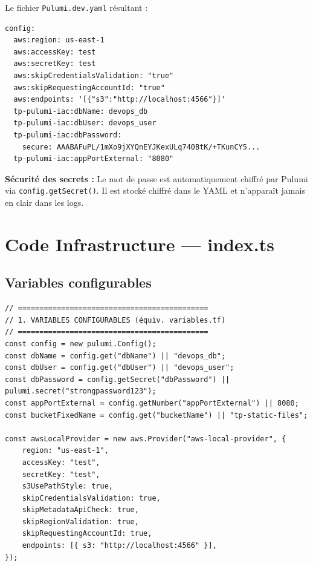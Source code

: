 \documentclass[12pt,a4paper]{article}
\begin{document}
Le fichier \texttt{Pulumi.dev.yaml} résultant :

\begin{lstlisting}[style=hclStyle, caption=Pulumi.dev.yaml]
config:
  aws:region: us-east-1
  aws:accessKey: test
  aws:secretKey: test
  aws:skipCredentialsValidation: "true"
  aws:skipRequestingAccountId: "true"
  aws:endpoints: '[{"s3":"http://localhost:4566"}]'
  tp-pulumi-iac:dbName: devops_db
  tp-pulumi-iac:dbUser: devops_user
  tp-pulumi-iac:dbPassword:
    secure: AAABAFuPL/1mXo9jXYQnEYJKexULq740BtK/+TKunCY5...
  tp-pulumi-iac:appPortExternal: "8080"
\end{lstlisting}

\begin{pubox}
\textbf{Sécurité des secrets :} Le mot de passe est automatiquement chiffré
par Pulumi via \texttt{config.getSecret()}. Il est stocké chiffré dans le YAML
et n'apparaît jamais en clair dans les logs.
\end{pubox}

\section{\textcolor{pulumiBlue}{Code Infrastructure --- index.ts}}

\subsection{Variables configurables}

\begin{lstlisting}[style=tsStyle, caption=Variables (équivalent variables.tf)]
// ============================================
// 1. VARIABLES CONFIGURABLES (équiv. variables.tf)
// ============================================
const config = new pulumi.Config();
const dbName = config.get("dbName") || "devops_db";
const dbUser = config.get("dbUser") || "devops_user";
const dbPassword = config.getSecret("dbPassword") || pulumi.secret("strongpassword123");
const appPortExternal = config.getNumber("appPortExternal") || 8080;
const bucketFixedName = config.get("bucketName") || "tp-static-files";

const awsLocalProvider = new aws.Provider("aws-local-provider", {
    region: "us-east-1",
    accessKey: "test",
    secretKey: "test",
    s3UsePathStyle: true,
    skipCredentialsValidation: true,
    skipMetadataApiCheck: true,
    skipRegionValidation: true,
    skipRequestingAccountId: true,
    endpoints: [{ s3: "http://localhost:4566" }],
});
\end{lstlisting}
\end{document}

